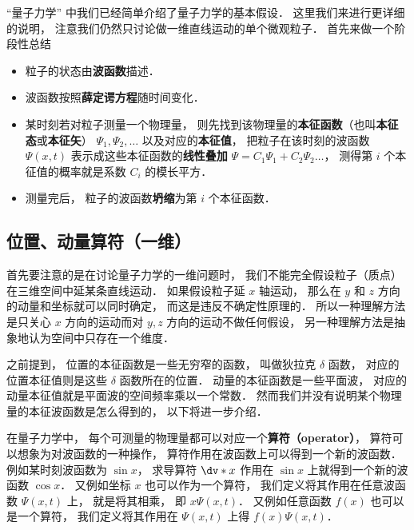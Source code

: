 


“量子力学” 中我们已经简单介绍了量子力学的基本假设． 这里我们来进行更详细的说明， 注意我们仍然只讨论做一维直线运动的单个微观粒子． 首先来做一个阶段性总结
\begin{itemize}
\item 粒子的状态由\textbf{波函数}描述．
\item 波函数按照\textbf{薛定谔方程}随时间变化．
\item 某时刻若对粒子测量一个物理量， 则先找到该物理量的\textbf{本征函数}（也叫\textbf{本征态}或\textbf{本征矢}） $\Psi_1, \Psi_2, \dots$ 以及对应的\textbf{本征值}， 把粒子在该时刻的波函数 $\Psi(x, t)$ 表示成这些本征函数的\textbf{线性叠加} $\Psi = C_1 \Psi_1 + C_2 \Psi_2\dots$， 测得第 $i$ 个本征值的概率就是系数 $C_i$ 的模长平方．
\item 测量完后， 粒子的波函数\textbf{坍缩}为第 $i$ 个本征函数．
\end{itemize}

\subsection{位置、动量算符（一维）}
首先要注意的是在讨论量子力学的一维问题时， 我们不能完全假设粒子（质点）在三维空间中延某条直线运动． 如果假设粒子延 $x$ 轴运动， 那么在 $y$ 和 $z$ 方向的动量和坐标就可以同时确定， 而这是违反不确定性原理的． 所以一种理解方法是只关心 $x$ 方向的运动而对 $y,z$ 方向的运动不做任何假设， 另一种理解方法是抽象地认为空间中只存在一个维度．

之前提到， 位置的本征函数是一些无穷窄的函数， 叫做狄拉克 $\delta$ 函数， 对应的位置本征值则是这些 $\delta$ 函数所在的位置． 动量的本征函数是一些平面波， 对应的动量本征值就是平面波的空间频率乘以一个常数． 然而我们并没有说明某个物理量的本征波函数是怎么得到的， 以下将进一步介绍．

在量子力学中， 每个可测量的物理量都可以对应一个\textbf{算符（operator）}， 算符可以想象为对波函数的一种操作， 算符作用在波函数上可以得到一个新的波函数． 例如某时刻波函数为 $\sin x$， 求导算符 $\dv*{x}$ 作用在 $\sin x$ 上就得到一个新的波函数 $\cos x$． 又例如坐标 $x$ 也可以作为一个算符， 我们定义将其作用在任意波函数 $\Psi(x, t)$ 上， 就是将其相乘， 即 $x\Psi(x, t)$． 又例如任意函数 $f(x)$ 也可以是一个算符， 我们定义将其作用在 $\Psi(x, t)$ 上得 $f(x)\Psi(x, t)$．


